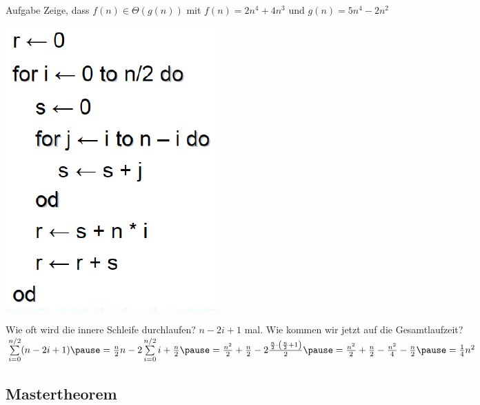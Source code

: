 \documentclass{beamer}
\begin{document}
\begin{frame}{Aufgabe}
	Zeige, dass $f(n) \in \Theta(g(n))$ mit $f(n)=2n^4+4n^3$ und $g(n)=5n^4-2n^2$
\end{frame}

\begin{frame}
	\includegraphics[scale=0.5]{images/okalk_algo.png}
	
	\begin{itemize}
		\pitem Wie oft wird die innere Schleife durchlaufen? \pause $n-2i+1$ mal.
		\pitem Wie kommen wir jetzt auf die Gesamtlaufzeit?
		\pitem $\sum\limits_{i=0}^{n/2} (n-2i+1) \ip = \frac{n}{2}n -2\sum\limits_{i=0}^{n/2}i+\frac{n}{2} \ip = \frac{n^2}{2}+\frac{n}{2}-2\frac{\frac{n}{2}\cdot \left(\frac{n}{2}+1\right)}{2} \ip = \frac{n^2}{2}+\frac{n}{2}-\frac{n^2}{4}-\frac{n}{2}\ip = \frac{1}{4}n^2$
	\end{itemize}
\end{frame}


\subsection{Mastertheorem}
\end{document}
